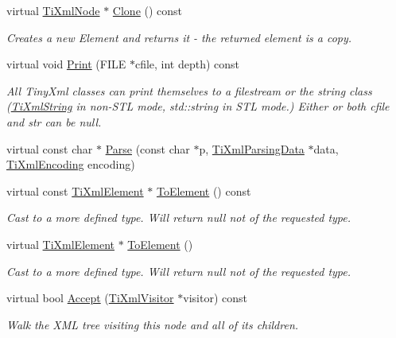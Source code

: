 \begin{DoxyCompactItemize}
virtual \hyperlink{classTiXmlNode}{TiXmlNode} $\ast$ \hyperlink{classTiXmlElement_a13f6df105ebb1e8dc636e75cc883be32}{Clone} () const 
\begin{DoxyCompactList}\small\item\em Creates a new Element and returns it -\/ the returned element is a copy. \item\end{DoxyCompactList}\item 
virtual void \hyperlink{classTiXmlElement_ad9d0c008866982ab8d9aafae7e14d692}{Print} (FILE $\ast$cfile, int depth) const 
\begin{DoxyCompactList}\small\item\em All TinyXml classes can print themselves to a filestream or the string class (\hyperlink{classTiXmlString}{TiXmlString} in non-\/STL mode, std::string in STL mode.) Either or both cfile and str can be null. \item\end{DoxyCompactList}\item 
virtual const char $\ast$ \hyperlink{classTiXmlElement_af95c9165159fd9dfdcc5b894a3fcf85b}{Parse} (const char $\ast$p, \hyperlink{classTiXmlParsingData}{TiXmlParsingData} $\ast$data, \hyperlink{tinyxml_8h_a88d51847a13ee0f4b4d320d03d2c4d96}{TiXmlEncoding} encoding)
\item 
virtual const \hyperlink{classTiXmlElement}{TiXmlElement} $\ast$ \hyperlink{classTiXmlElement_ac5b8d0e25fa23fd9acbb6d146082901c}{ToElement} () const 
\begin{DoxyCompactList}\small\item\em Cast to a more defined type. Will return null not of the requested type. \item\end{DoxyCompactList}\item 
virtual \hyperlink{classTiXmlElement}{TiXmlElement} $\ast$ \hyperlink{classTiXmlElement_a9def86337ea7a755eb41cac980f60c7a}{ToElement} ()
\begin{DoxyCompactList}\small\item\em Cast to a more defined type. Will return null not of the requested type. \item\end{DoxyCompactList}\item 
virtual bool \hyperlink{classTiXmlElement_a31ab28cc3b892a69254391d6bbe08df3}{Accept} (\hyperlink{classTiXmlVisitor}{TiXmlVisitor} $\ast$visitor) const 
\begin{DoxyCompactList}\small\item\em Walk the XML tree visiting this node and all of its children. \item\end{DoxyCompactList}\item 

\end{DoxyCompactItemize}
